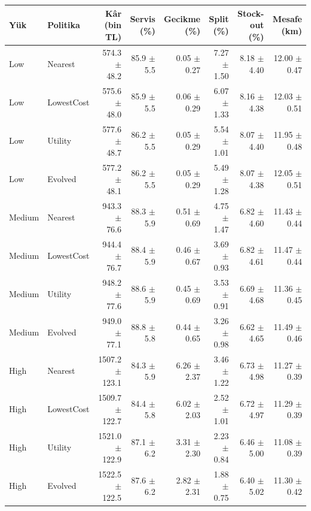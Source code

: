 \begin{tabular}{llrrrrrr}
\hline
Yük & Politika & Kâr (bin TL) & Servis (\%) & Gecikme (\%) & Split (\%) & Stock-out (\%) & Mesafe (km) \\
\hline
Low & Nearest & 574.3 $\pm$ 48.2 & 85.9 $\pm$ 5.5 & 0.05 $\pm$ 0.27 & 7.27 $\pm$ 1.50 & 8.18 $\pm$ 4.40 & 12.00 $\pm$ 0.47 \\
Low & LowestCost & 575.6 $\pm$ 48.0 & 85.9 $\pm$ 5.5 & 0.06 $\pm$ 0.29 & 6.07 $\pm$ 1.33 & 8.16 $\pm$ 4.38 & 12.03 $\pm$ 0.51 \\
Low & Utility & 577.6 $\pm$ 48.7 & 86.2 $\pm$ 5.5 & 0.05 $\pm$ 0.29 & 5.54 $\pm$ 1.01 & 8.07 $\pm$ 4.40 & 11.95 $\pm$ 0.48 \\
Low & Evolved & 577.2 $\pm$ 48.1 & 86.2 $\pm$ 5.5 & 0.05 $\pm$ 0.29 & 5.49 $\pm$ 1.28 & 8.07 $\pm$ 4.38 & 12.05 $\pm$ 0.51 \\
Medium & Nearest & 943.3 $\pm$ 76.6 & 88.3 $\pm$ 5.9 & 0.51 $\pm$ 0.69 & 4.75 $\pm$ 1.47 & 6.82 $\pm$ 4.60 & 11.43 $\pm$ 0.44 \\
Medium & LowestCost & 944.4 $\pm$ 76.7 & 88.4 $\pm$ 5.9 & 0.46 $\pm$ 0.67 & 3.69 $\pm$ 0.93 & 6.82 $\pm$ 4.61 & 11.47 $\pm$ 0.44 \\
Medium & Utility & 948.2 $\pm$ 77.6 & 88.6 $\pm$ 5.9 & 0.45 $\pm$ 0.69 & 3.53 $\pm$ 0.91 & 6.69 $\pm$ 4.68 & 11.36 $\pm$ 0.45 \\
Medium & Evolved & 949.0 $\pm$ 77.1 & 88.8 $\pm$ 5.8 & 0.44 $\pm$ 0.65 & 3.26 $\pm$ 0.98 & 6.62 $\pm$ 4.65 & 11.49 $\pm$ 0.46 \\
High & Nearest & 1507.2 $\pm$ 123.1 & 84.3 $\pm$ 5.9 & 6.26 $\pm$ 2.37 & 3.46 $\pm$ 1.22 & 6.73 $\pm$ 4.98 & 11.27 $\pm$ 0.39 \\
High & LowestCost & 1509.7 $\pm$ 122.7 & 84.4 $\pm$ 5.8 & 6.02 $\pm$ 2.03 & 2.52 $\pm$ 1.01 & 6.72 $\pm$ 4.97 & 11.29 $\pm$ 0.39 \\
High & Utility & 1521.0 $\pm$ 122.9 & 87.1 $\pm$ 6.2 & 3.31 $\pm$ 2.30 & 2.23 $\pm$ 0.84 & 6.46 $\pm$ 5.00 & 11.08 $\pm$ 0.39 \\
High & Evolved & 1522.5 $\pm$ 122.5 & 87.6 $\pm$ 6.2 & 2.82 $\pm$ 2.31 & 1.88 $\pm$ 0.75 & 6.40 $\pm$ 5.02 & 11.30 $\pm$ 0.42 \\
\hline
\end{tabular}
